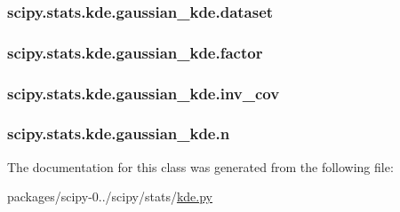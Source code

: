 \subsubsection[{dataset}]{\setlength{\rightskip}{0pt plus 5cm}scipy.\+stats.\+kde.\+gaussian\+\_\+kde.\+dataset}\label{classscipy_1_1stats_1_1kde_1_1gaussian__kde_a9b885c9459c184a1c516a33b38444c16}
\hypertarget{classscipy_1_1stats_1_1kde_1_1gaussian__kde_acee9260bd649ac101e5ccfbb5f180543}{}
\subsubsection[{factor}]{\setlength{\rightskip}{0pt plus 5cm}scipy.\+stats.\+kde.\+gaussian\+\_\+kde.\+factor}\label{classscipy_1_1stats_1_1kde_1_1gaussian__kde_acee9260bd649ac101e5ccfbb5f180543}
\hypertarget{classscipy_1_1stats_1_1kde_1_1gaussian__kde_a92eef97e05fed104ccce6746ad07710c}{}
\subsubsection[{inv\+\_\+cov}]{\setlength{\rightskip}{0pt plus 5cm}scipy.\+stats.\+kde.\+gaussian\+\_\+kde.\+inv\+\_\+cov}\label{classscipy_1_1stats_1_1kde_1_1gaussian__kde_a92eef97e05fed104ccce6746ad07710c}
\hypertarget{classscipy_1_1stats_1_1kde_1_1gaussian__kde_a1db123868b2181c0454880533ac00c60}{}
\subsubsection[{n}]{\setlength{\rightskip}{0pt plus 5cm}scipy.\+stats.\+kde.\+gaussian\+\_\+kde.\+n}\label{classscipy_1_1stats_1_1kde_1_1gaussian__kde_a1db123868b2181c0454880533ac00c60}


The documentation for this class was generated from the following file\+:\begin{DoxyCompactItemize}
\item 
packages/scipy-\/0../scipy/stats/\hyperlink{kde_8py}{kde.\+py}\end{DoxyCompactItemize}
